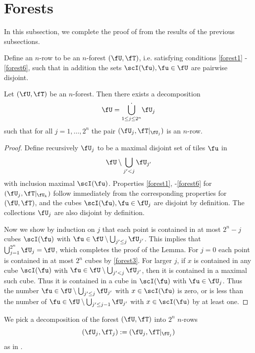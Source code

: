 \section{Forests}
In this subsection, we complete the proof of  from the results of the previous subsections.

Define an $n$-row to be an $n$-forest $(\fU, \fT)$, i.e. satisfying conditions \eqref{forest1} - \eqref{forest6}, such that in addition the sets $\scI(\fu), \fu \in \fU$ are pairwise disjoint.

\begin{lemma}
    \label{forest-row-decomposition}
    \leanok
    Let $(\fU, \fT)$ be an $n$-forest. Then there exists a decomposition
    $$
        \fU = \dot{\bigcup_{1 \le j \le 2^n}} \fU_j
    $$
    such that for all $j = 1, \dotsc, 2^n$ the pair $(\fU_j, \fT|_{\fU_j})$ is an $n$-row.
\end{lemma}

\begin{proof}
    Define recursively $\fU_j$ to be a maximal disjoint set of tiles $\fu$ in
    $$
        \fU \setminus \bigcup_{j' < j} \fU_{j'}
    $$
    with inclusion maximal $\scI(\fu)$. Properties \eqref{forest1}, -\eqref{forest6} for $(\fU_j, \fT|_{\fU_k})$ follow immediately from the corresponding properties for $(\fU, \fT)$, and the cubes $\scI(\fu), \fu \in \fU_j$ are disjoint by definition. The collections $\fU_j$ are also disjoint by definition.

    Now we show by induction on $j$ that each point is contained in at most $2^n - j$ cubes $\scI(\fu)$ with $\fu \in \fU \setminus \bigcup_{j' \le j} \fU_{j'}$. This implies that $\bigcup_{j = 1}^{2^n} \fU_j = \fU$, which completes the proof of the Lemma. For $j = 0$ each point is contained in at most $2^n$ cubes by \eqref{forest3}. For larger $j$, if $x$ is contained in any cube $\scI(\fu)$ with $\fu \in \fU \setminus \bigcup_{j' < j} \fU_{j'}$, then it is contained in a maximal such cube. Thus it is contained in a cube in $\scI(\fu)$ with $\fu \in \fU_j$. Thus the number $\fu \in \fU \setminus \bigcup_{j' \le j} \fU_{j'}$ with $x\in \scI(\fu)$ is zero, or is less than the number of $\fu \in \fU \setminus \bigcup_{j' \le j-1} \fU_{j'}$ with $x \in \scI(\fu)$ by at least one.
\end{proof}

We pick a decomposition of the forest $(\fU, \fT)$ into $2^n$ $n$-rows
\begin{equation*}
(\fU_j, \fT_j) := (\fU_j, \fT|_{\fU_j})
\end{equation*}
as in .


